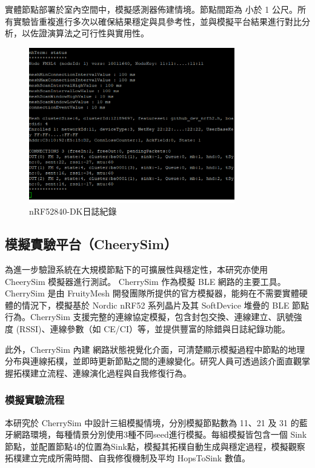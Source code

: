 \begin{ZhChapter}
實體節點部署於室內空間中，模擬感測器佈建情境。節點間距為 小於 1 公尺。所有實驗皆重複進行多次以確保結果穩定與具參考性，並與模擬平台結果進行對比分析，以佐證演算法之可行性與實用性。

\begin{figure}[H]
    \centering
    \includegraphics[width = 0.8\textwidth]{image/UART日誌紀錄.png}
    \caption{nRF52840-DK日誌紀錄}
    \label{fig: nRF52840-DK日誌紀錄}
\end{figure}

\subsection{模擬實驗平台（CheerySim）}
為進一步驗證系統在大規模節點下的可擴展性與穩定性，本研究亦使用 CheerySim 模擬器進行測試。 CherrySim 作為模擬 BLE 網路的主要工具。CherrySim 是由 FruityMesh 開發團隊所提供的官方模擬器，能夠在不需要實體硬體的情況下，模擬基於 Nordic nRF52 系列晶片及其 SoftDevice 堆疊的 BLE 節點行為。CherrySim 支援完整的連線協定模擬，包含封包交換、連線建立、訊號強度 (RSSI)、連線參數（如 CE/CI）等，並提供豐富的除錯與日誌紀錄功能。

此外，CherrySim 內建 網路狀態視覺化介面，可清楚顯示模擬過程中節點的地理分布與連線拓樸，並即時更新節點之間的連線變化。研究人員可透過該介面直觀掌握拓樸建立流程、連線演化過程與自我修復行為。

\subsubsection{模擬實驗流程}
本研究於 CherrySim 中設計三組模擬情境，分別模擬節點數為 11、21 及 31 的藍牙網路環境，每種情景分別使用3種不同seed進行模擬。每組模擬皆包含一個 Sink 節點，並配置節點4的位置為Sink點，模擬其拓樸自動生成與穩定過程，模擬觀察拓樸建立完成所需時間、自我修復機制及平均 HopsToSink 數值。


\end{ZhChapter}
